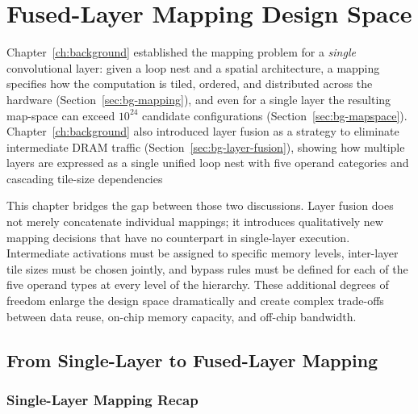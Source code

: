 \chapter{Fused-Layer Mapping Design Space}
\label{ch:fused-design-space}

Chapter~\ref{ch:background} established the mapping problem for a
\emph{single} convolutional layer: given a loop nest and a spatial
architecture, a mapping specifies how the computation is tiled,
ordered, and distributed across the hardware
(Section~\ref{sec:bg-mapping}), and even for a single layer the
resulting map-space can exceed $10^{24}$ candidate configurations
(Section~\ref{sec:bg-mapspace}).
Chapter~\ref{ch:background} also introduced layer fusion as a strategy
to eliminate intermediate DRAM traffic
(Section~\ref{sec:bg-layer-fusion}), showing how multiple layers are
expressed as a single unified loop nest with five operand categories
and cascading tile-size dependencies

This chapter bridges the gap between those two discussions.
Layer fusion does not merely concatenate individual mappings; it
introduces qualitatively new mapping decisions that have no
counterpart in single-layer execution.
Intermediate activations must be assigned to specific memory levels,
inter-layer tile sizes must be chosen jointly, and bypass rules must
be defined for each of the five operand types at every level of the
hierarchy.
These additional degrees of freedom enlarge the design space
dramatically and create complex trade-offs between data reuse,
on-chip memory capacity, and off-chip bandwidth.

\section{From Single-Layer to Fused-Layer Mapping}
\label{sec:fds-from-single}

\subsection{Single-Layer Mapping Recap}
\label{sec:fds-single-recap}

